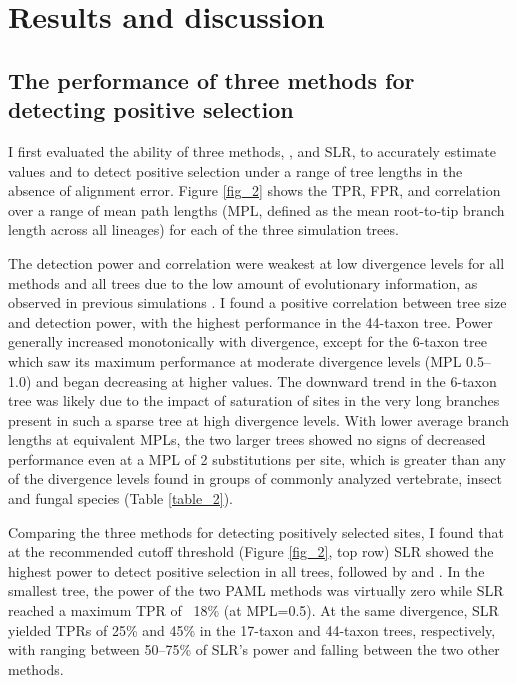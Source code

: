 \section{Results and discussion}
\subsection{The performance of three methods for detecting \sw positive selection}
I first evaluated the ability of three \sw methods, \mtwo, \meight
and SLR, to accurately estimate \sw \omg values and to detect
positive selection under a range of tree lengths in the absence of
alignment error. Figure \ref{fig_2} shows the TPR, FPR, \tpr{} and \sw
\omg correlation over a range of mean path lengths
(MPL, defined as the mean root-to-tip branch
  length across all lineages) for each of the three simulation trees.

The detection power and \omg correlation were weakest at low
divergence levels for all methods and all trees due to the low amount
of evolutionary information, as observed in previous simulations
\citep{Anisimova2002Accuracy}. I found a positive correlation between
tree size and detection power, with the highest performance in the
44-taxon tree. Power generally increased monotonically with
divergence, except for the 6-taxon tree which saw its maximum
performance at moderate divergence levels (MPL 0.5--1.0) and began
decreasing at higher values. The downward trend in the 6-taxon tree
was likely due to the impact of saturation of \syn sites in the
very long branches present in such a sparse tree at high divergence
levels. With lower average branch lengths at equivalent MPLs, the two
larger trees showed no signs of decreased performance even at a MPL of
2 substitutions per site, which is greater than any of the divergence
levels found in groups of commonly analyzed vertebrate, insect and
fungal species (Table \ref{table_2}).

Comparing the three methods for detecting positively selected sites, I found that at the
recommended cutoff threshold (Figure \ref{fig_2}, top row) SLR showed
the highest power to detect positive selection in all trees, followed
by \meight and \mtwo. In the smallest tree, the power of the two
PAML methods was virtually zero while SLR reached a maximum TPR of ~18\%
(at MPL=0.5). At the same divergence, SLR yielded TPRs of 25\% and 45\%
in the 17-taxon and 44-taxon trees, respectively, with \mtwo ranging
between 50--75\% of SLR's power and \meight falling between the two
other methods.

